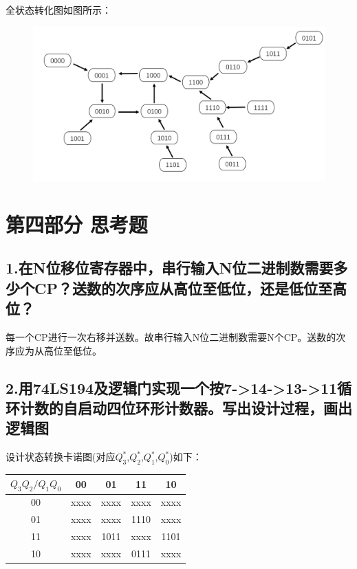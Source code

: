 \documentclass{ctexart}
\begin{document}
    全状态转化图如图所示：
    
    \begin{figure}[htbp]
        \centering
        \includegraphics[width=15cm]{3.4.2.png}
    \end{figure}
  

   
    \section*{第四部分 \quad 思考题}
    \subsection*{1.在N位移位寄存器中，串行输入N位二进制数需要多少个CP？送数的次序应从高位至低位，还是低位至高位？}
    
    每一个CP进行一次右移并送数。故串行输入N位二进制数需要N个CP。送数的次序应为从高位至低位。

    \subsection*{2.用74LS194及逻辑门实现一个按7->14->13->11循环计数的自启动四位环形计数器。写出设计过程，画出逻辑图}
    设计状态转换卡诺图(对应$Q^*_3$,$Q^*_2$,$Q^*_1$,$Q^*_0$)如下：
    \begin{table}[!ht]
    \centering
    \begin{tabular}{|c|c|c|c|c|}
    \hline
    $Q_3Q_2/Q_1Q_0$ & 00   & 01   & 11   & 10   \\ \hline
    00              & xxxx & xxxx & xxxx & xxxx \\ \hline
    01              & xxxx & xxxx & 1110 & xxxx \\ \hline
    11              & xxxx & 1011 & xxxx & 1101 \\ \hline
    10              & xxxx & xxxx & 0111 & xxxx \\ \hline
    \end{tabular}
    \end{table}
\end{document}
